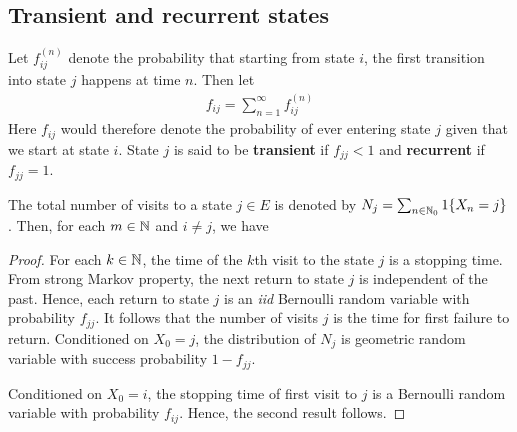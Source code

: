 \documentclass[a4paper,10pt,english]{article}
\begin{document}
\subsection{Transient and recurrent states}
Let $f_{ij}^{(n)}$ denote the probability that starting from state $i$, the first transition into state $j$ happens at time $n$. Then let
\begin{align*}f_{ij} = \sum_{n=1}^\infty f_{ij}^{(n)}\end{align*}
Here $f_{ij}$ would therefore denote the probability of ever entering state $j$ given that we start at state $i$. 
State $j$ is said to be \textbf{transient} if $f_{jj} < 1$ and \textbf{recurrent} if $f_{jj}=1$. 
\begin{prop} 
The total number of visits to a state $j \in E$ is denoted by 
$N_j = \sum_{n \in \mathbb{N}_0}1\{X_n = j\}$.
Then, for each $m \in \mathbb{N}$ and $i \neq j$, we have 
\end{prop}
\begin{proof}
For each $k \in \mathbb{N}$, the time of the $k$th visit to the state $j$ is a stopping time. 
From strong Markov property, the next return to state $j$ is independent of the past. 
Hence, each return to state $j$ is an \textit{iid} Bernoulli random variable with probability $f_{jj}$. 
It follows that the number of visits $j$ is the time for first failure to return. 
Conditioned on $X_0 = j$, the distribution of $N_j$ is geometric random variable with success probability $1-f_{jj}$. 

Conditioned on $X_0 = i$, the stopping time of first visit to $j$ is a Bernoulli random variable with probability $f_{ij}$. 
Hence, the second result follows. 
\end{proof}
\end{document}
